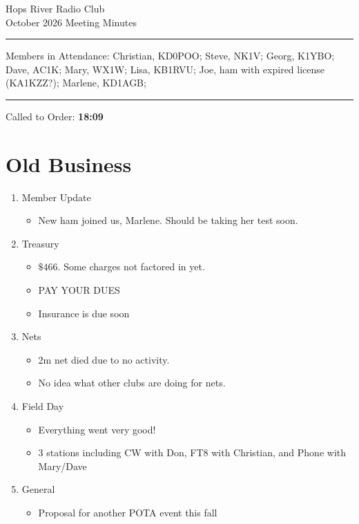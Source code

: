 \documentclass[12pt, letterpaper]{article}
\begin{document}
\begin{center}
	\huge{Hops River Radio Club}\\[10pt]
	\large{October 2026 Meeting Minutes}
\end{center}
\rule{\textwidth}{0.5pt}
	\noindent Members in Attendance: Christian, KD0POO;  Steve, NK1V; Georg, K1YBO; Dave, AC1K; Mary, WX1W; Lisa, KB1RVU; Joe, ham with expired license (KA1KZZ?);  Marlene, KD1AGB;

\rule{\textwidth}{0.5pt}

Called to Order: \textbf{18:09}

\section{Old Business}
    \begin{enumerate}
    \item Member Update
        \begin{itemize}
            \item  New ham joined us, Marlene. Should be taking her test soon.
        \end{itemize}
    \item Treasury
        \begin{itemize}
            \item $\mathdollar 466$. Some charges not factored in yet.
            \item PAY YOUR DUES
            \item Insurance is due soon
        \end{itemize}
    \item Nets
        \begin{itemize}
            \item 2m net died due to no activity.
            \item No idea what other clubs are doing for nets.
        \end{itemize}
    \item Field Day
        \begin{itemize}
            \item Everything went very good!
            \item 3 stations including CW with Don, FT8 with Christian, and Phone with Mary/Dave
        \end{itemize}
    \item General
        \begin{itemize}
            \item Proposal for another POTA event this fall

\end{itemize}
\end{enumerate}
\end{document}
